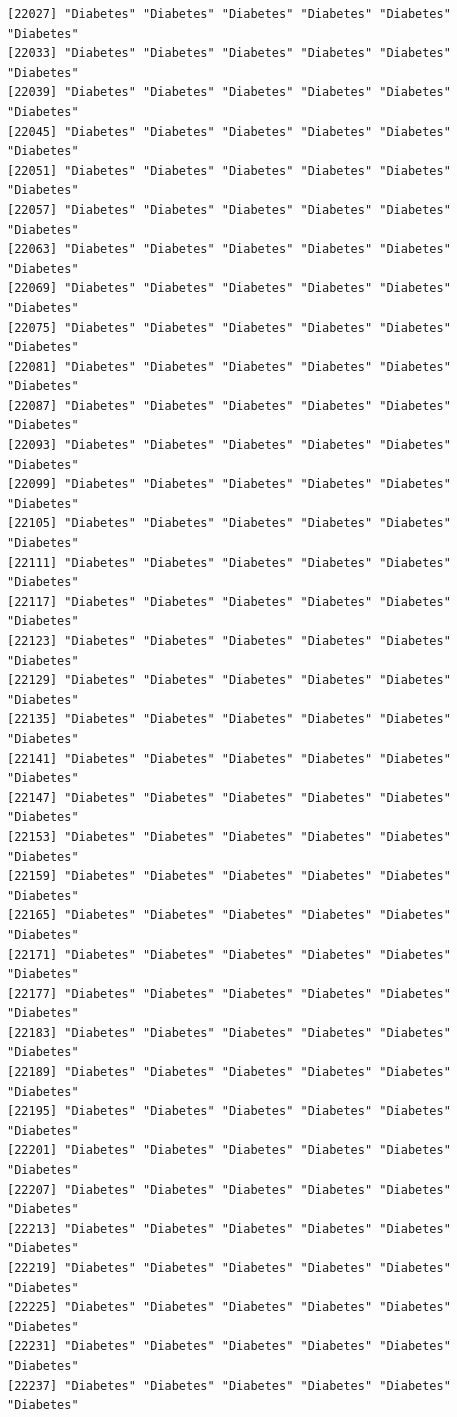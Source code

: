 \documentclass[
  letterpaper,
  DIV=11,
  numbers=noendperiod]{scrartcl}
\begin{document}
\begin{verbatim}
[22027] "Diabetes" "Diabetes" "Diabetes" "Diabetes" "Diabetes" "Diabetes"
[22033] "Diabetes" "Diabetes" "Diabetes" "Diabetes" "Diabetes" "Diabetes"
[22039] "Diabetes" "Diabetes" "Diabetes" "Diabetes" "Diabetes" "Diabetes"
[22045] "Diabetes" "Diabetes" "Diabetes" "Diabetes" "Diabetes" "Diabetes"
[22051] "Diabetes" "Diabetes" "Diabetes" "Diabetes" "Diabetes" "Diabetes"
[22057] "Diabetes" "Diabetes" "Diabetes" "Diabetes" "Diabetes" "Diabetes"
[22063] "Diabetes" "Diabetes" "Diabetes" "Diabetes" "Diabetes" "Diabetes"
[22069] "Diabetes" "Diabetes" "Diabetes" "Diabetes" "Diabetes" "Diabetes"
[22075] "Diabetes" "Diabetes" "Diabetes" "Diabetes" "Diabetes" "Diabetes"
[22081] "Diabetes" "Diabetes" "Diabetes" "Diabetes" "Diabetes" "Diabetes"
[22087] "Diabetes" "Diabetes" "Diabetes" "Diabetes" "Diabetes" "Diabetes"
[22093] "Diabetes" "Diabetes" "Diabetes" "Diabetes" "Diabetes" "Diabetes"
[22099] "Diabetes" "Diabetes" "Diabetes" "Diabetes" "Diabetes" "Diabetes"
[22105] "Diabetes" "Diabetes" "Diabetes" "Diabetes" "Diabetes" "Diabetes"
[22111] "Diabetes" "Diabetes" "Diabetes" "Diabetes" "Diabetes" "Diabetes"
[22117] "Diabetes" "Diabetes" "Diabetes" "Diabetes" "Diabetes" "Diabetes"
[22123] "Diabetes" "Diabetes" "Diabetes" "Diabetes" "Diabetes" "Diabetes"
[22129] "Diabetes" "Diabetes" "Diabetes" "Diabetes" "Diabetes" "Diabetes"
[22135] "Diabetes" "Diabetes" "Diabetes" "Diabetes" "Diabetes" "Diabetes"
[22141] "Diabetes" "Diabetes" "Diabetes" "Diabetes" "Diabetes" "Diabetes"
[22147] "Diabetes" "Diabetes" "Diabetes" "Diabetes" "Diabetes" "Diabetes"
[22153] "Diabetes" "Diabetes" "Diabetes" "Diabetes" "Diabetes" "Diabetes"
[22159] "Diabetes" "Diabetes" "Diabetes" "Diabetes" "Diabetes" "Diabetes"
[22165] "Diabetes" "Diabetes" "Diabetes" "Diabetes" "Diabetes" "Diabetes"
[22171] "Diabetes" "Diabetes" "Diabetes" "Diabetes" "Diabetes" "Diabetes"
[22177] "Diabetes" "Diabetes" "Diabetes" "Diabetes" "Diabetes" "Diabetes"
[22183] "Diabetes" "Diabetes" "Diabetes" "Diabetes" "Diabetes" "Diabetes"
[22189] "Diabetes" "Diabetes" "Diabetes" "Diabetes" "Diabetes" "Diabetes"
[22195] "Diabetes" "Diabetes" "Diabetes" "Diabetes" "Diabetes" "Diabetes"
[22201] "Diabetes" "Diabetes" "Diabetes" "Diabetes" "Diabetes" "Diabetes"
[22207] "Diabetes" "Diabetes" "Diabetes" "Diabetes" "Diabetes" "Diabetes"
[22213] "Diabetes" "Diabetes" "Diabetes" "Diabetes" "Diabetes" "Diabetes"
[22219] "Diabetes" "Diabetes" "Diabetes" "Diabetes" "Diabetes" "Diabetes"
[22225] "Diabetes" "Diabetes" "Diabetes" "Diabetes" "Diabetes" "Diabetes"
[22231] "Diabetes" "Diabetes" "Diabetes" "Diabetes" "Diabetes" "Diabetes"
[22237] "Diabetes" "Diabetes" "Diabetes" "Diabetes" "Diabetes" "Diabetes"

\end{verbatim}
\end{document}
